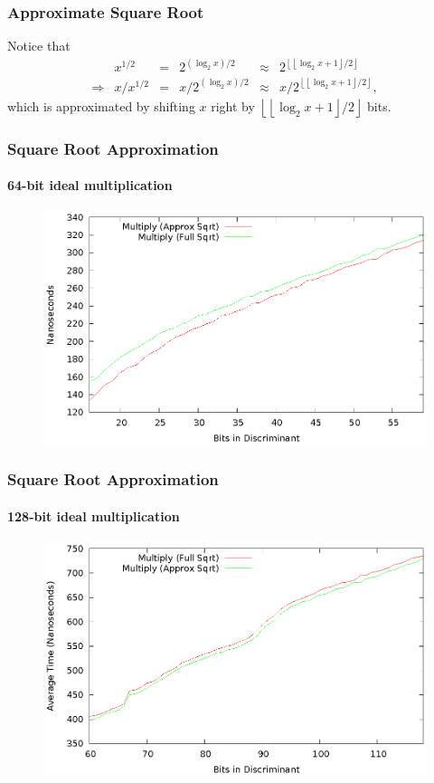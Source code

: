 \documentclass{beamer}
\newcommand{\floor}[1]{\left\lfloor #1 \right\rfloor}
\begin{document}
\begin{frame}
\frametitle{Approximate Square Root}
Notice that
\begin{equation*}
\begin{array}{rrlrlr}
	& x^{1/2} &=& 2^{(\log_2x)/2} &\approx& 2^{\floor{\floor{\log_2x+1}/2}} \\
	\Rightarrow & x / x^{1/2} &=& x / 2^{(\log_2x)/2} &\approx& x / 2^{\floor{\floor{\log_2x+1}/2}},
\end{array}
\end{equation*}
which is approximated by shifting $x$ right by $\floor{\floor{\log_2x+1}/2}$ bits.
\end{frame}

\begin{frame}
\frametitle{Square Root Approximation}
\framesubtitle{64-bit ideal multiplication}
\begin{figure}
\includegraphics[scale=0.86]{compose-sqrtopt-64}
\end{figure}
\end{frame}

\begin{frame}
\frametitle{Square Root Approximation}
\framesubtitle{128-bit ideal multiplication}
\begin{figure}
\includegraphics[scale=0.86]{compose-sqrtopt-128}
\end{figure}
\end{frame}
\end{document}
